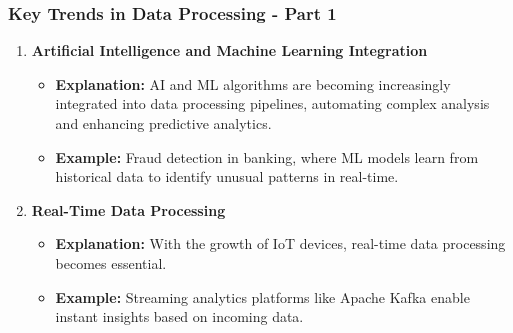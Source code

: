 \documentclass[aspectratio=169]{beamer}
\begin{document}
\begin{frame}[fragile]
    \frametitle{Key Trends in Data Processing - Part 1}
    \begin{enumerate}
        \item \textbf{Artificial Intelligence and Machine Learning Integration}
            \begin{itemize}
                \item \textbf{Explanation:} AI and ML algorithms are becoming increasingly integrated into data processing pipelines, automating complex analysis and enhancing predictive analytics.
                \item \textbf{Example:} Fraud detection in banking, where ML models learn from historical data to identify unusual patterns in real-time.
            \end{itemize}
        
        \item \textbf{Real-Time Data Processing}
            \begin{itemize}
                \item \textbf{Explanation:} With the growth of IoT devices, real-time data processing becomes essential.
                \item \textbf{Example:} Streaming analytics platforms like Apache Kafka enable instant insights based on incoming data.
            \end{itemize}

    \end{enumerate}
\end{frame}
\end{document}
